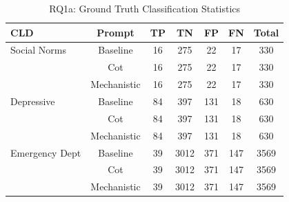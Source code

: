 \begin{table}[htbp]
\centering
\caption{RQ1a: Ground Truth Classification Statistics}
\label{tab:rq1a_gt_classification}
\begin{tabular}{lcccccc}
\toprule
\textbf{CLD} & \textbf{Prompt} & \textbf{TP} & \textbf{TN} & \textbf{FP} & \textbf{FN} & \textbf{Total} \\
\midrule
Social Norms & Baseline & 16 & 275 & 22 & 17 & 330 \\
 & Cot & 16 & 275 & 22 & 17 & 330 \\
 & Mechanistic & 16 & 275 & 22 & 17 & 330 \\
\midrule
Depressive & Baseline & 84 & 397 & 131 & 18 & 630 \\
 & Cot & 84 & 397 & 131 & 18 & 630 \\
 & Mechanistic & 84 & 397 & 131 & 18 & 630 \\
\midrule
Emergency Dept & Baseline & 39 & 3012 & 371 & 147 & 3569 \\
 & Cot & 39 & 3012 & 371 & 147 & 3569 \\
 & Mechanistic & 39 & 3012 & 371 & 147 & 3569 \\
\midrule
\bottomrule
\end{tabular}
\end{table}